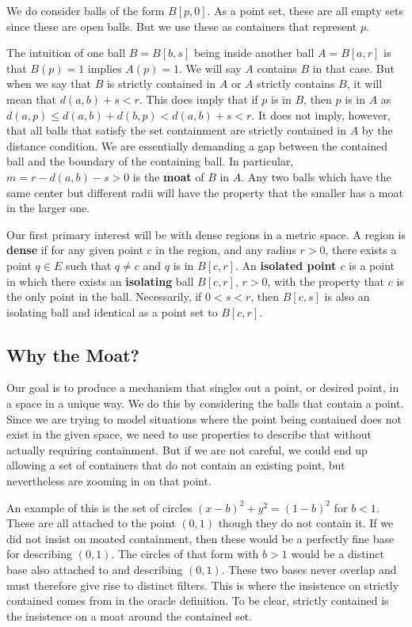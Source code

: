 \documentclass[12pt]{article}
\begin{document}
We do consider balls of the form $B[p, 0]$. As a point set, these are all empty sets since these are open balls. But we use these as containers that represent $p$. 

The intuition of one ball $B= B[b,s]$ being inside another ball $A= B[a, r]$ is that  $B(p) = 1$ implies $A(p) = 1$. We will say $A$ contains $B$ in that case. But when we say that $B$ is strictly contained in $A$ or $A$ strictly contains $B$, it will mean that $d(a,b) + s < r$. This does imply that if $p$ is in $B$, then $p$ is in $A$ as $d(a, p) \leq d(a, b) + d(b, p) < d(a,b) + s < r$. It does not imply, however, that all balls that satisfy the set containment are strictly contained in $A$ by the distance condition. We are essentially demanding a gap between the contained ball and the boundary of the containing ball. In particular, $m = r - d(a,b) - s > 0$ is the \textbf{moat} of $B$ in $A$. Any two balls which have the same center but different radii will have the property that the smaller has a moat in the larger one. 

Our first primary interest will be with dense regions in a metric space. A region is \textbf{dense} if for any given point $c$ in the region, and any radius $r>0$, there exists a point $q \in E$ such that $q \neq c$ and $q$ is in $B[c,r]$. An \textbf{isolated point $c$} is a point in which there exists an \textbf{isolating} ball $B[c, r]$, $r > 0$, with the property that $c$ is the only point in the ball. Necessarily, if $0 < s < r$, then $B[c, s]$ is also an isolating ball and identical as a point set to $B[c,r]$. 

\subsection{Why the Moat?}

Our goal is to produce a mechanism that singles out a point, or desired point, in a space in a unique way. We do this by considering the balls that contain a point. Since we are trying to model situations where the point being contained does not exist in the given space, we need to use properties to describe that without actually requiring containment. But if we are not careful, we could end up allowing a set of containers that do not contain an existing point, but nevertheless are zooming in on that point. 

An example of this is the set of circles $(x-b)^2 + y^2 = (1-b)^2$ for $b < 1$. These are all attached to the point $(0,1)$ though they do not contain it. If we did not insist on moated containment, then these would be a perfectly fine base for describing $(0,1)$. The circles of that form with $b > 1$ would be a distinct base also attached to and describing $(0,1)$. These two bases never overlap and must therefore give rise to distinct filters. This is where the insistence on strictly contained comes from in the oracle definition. To be clear, strictly contained is the insistence on a moat around the contained set. 
\end{document}
